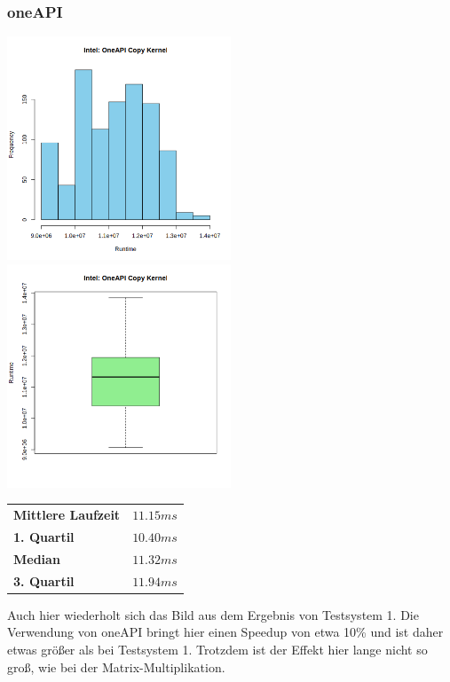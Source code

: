 \documentclass[12pt]{article}
\begin{document}
	\subsubsection*{oneAPI}
	\includegraphics[width=0.5\textwidth]{../statistics/intel/oneapi/histogram_copy.png}
	\includegraphics[width=0.5\textwidth]{../statistics/intel/oneapi/boxplot_copy.png}
	\\
	\begin{center}
		\begin{tabular}{|l|l|}
			\toprule
			\textbf{Mittlere Laufzeit} 		& $11.15ms$ \\
			\textbf{1. Quartil}				& $10.40ms$ \\
			\textbf{Median}					& $11.32ms$  \\
			\textbf{3. Quartil}				& $11.94ms$  \\
			\bottomrule
		\end{tabular}
	\end{center}
	\medskip
	
	Auch hier wiederholt sich das Bild aus dem Ergebnis von Testsystem 1.
	Die Verwendung von oneAPI bringt hier einen Speedup von etwa 10\% und ist daher etwas größer als bei Testsystem 1.
	Trotzdem ist der Effekt hier lange nicht so groß, wie bei der Matrix-Multiplikation.
	
\end{document}
